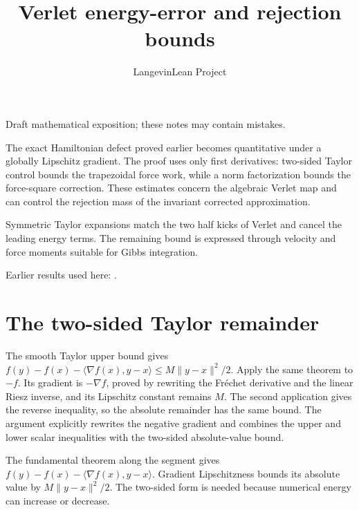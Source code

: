 \documentclass[11pt,a4paper]{article}
\title{\texorpdfstring{Verlet energy-error and rejection bounds}{Verlet energy-error and rejection bounds}}
\author{LangevinLean Project}
\date{}
\begin{document}
\maketitle
Draft mathematical exposition; these notes may contain mistakes.


The exact Hamiltonian defect proved earlier becomes quantitative under a globally Lipschitz gradient. The proof uses only first derivatives: two-sided Taylor control bounds the trapezoidal force work, while a norm factorization bounds the force-square correction. These estimates concern the algebraic Verlet map and can control the rejection mass of the invariant corrected approximation.



Symmetric Taylor expansions match the two half kicks of Verlet and cancel the leading energy terms. The remaining bound is expressed through velocity and force moments suitable for Gibbs integration.



Earlier results used here: \cite[Section~3.9]{LangevinLean2026ULASC}.

\section{\texorpdfstring{The two-sided Taylor remainder}{The two-sided Taylor remainder}}


The smooth Taylor upper bound gives \(f(y)-f(x)-\langle\nabla f(x),y-x\rangle\le M\|y-x\|^2/2\). Apply the same theorem to \(-f\). Its gradient is \(-\nabla f\), proved by rewriting the Fréchet derivative and the linear Riesz inverse, and its Lipschitz constant remains \(M\). The second application gives the reverse inequality, so the absolute remainder has the same bound. The argument explicitly rewrites the negative gradient and combines the upper and lower scalar inequalities with the two-sided absolute-value bound.



The fundamental theorem along the segment gives \(f(y)-f(x)-\langle\nabla f(x),y-x\rangle\). Gradient Lipschitzness bounds its absolute value by \(M\|y-x\|^2/2\). The two-sided form is needed because numerical energy can increase or decrease.
\end{document}
